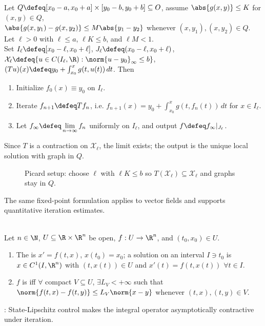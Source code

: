 \begin{method} \label{meth:picard-iteration-local-ode} \\
Let $Q\defeq[x_0-a,x_0+a]\times[y_0-b,y_0+b]\subseteq O$, assume $\abs{g(x,y)}\leq K$ for $(x,y)\in Q$,\\
$\abs{g(x,y_1)-g(x,y_2)}\leq M\abs{y_1-y_2}$ whenever $(x,y_1),(x,y_2)\in Q$. Let $\ell>0$ with $\ell\leq a$, $\ell K\leq b$, and $\ell M<1$.\\
Set $I_\ell\defeq[x_0-\ell,x_0+\ell]$, $J_\ell\defeq(x_0-\ell,x_0+\ell)$, $\mathcal{X}_\ell\defeq\{u\in C(I_\ell,\R):\norm{u-y_0}_\infty\leq b\}$,\\
$(Tu)(x)\defeq y_0+\int_{x_0}^{x}g(t,u(t))\,dt$. Then
\begin{enumerate}[label=(\roman*)]
\setlength{\itemsep}{0pt}
\item Initialize $f_0(x)\equiv y_0$ on $I_\ell$.
\item Iterate $f_{n+1}\defeq Tf_n$, i.e. $f_{n+1}(x)=y_0+\int_{x_0}^{x}g(t,f_n(t))\,dt$ for $x\in I_\ell$.
\item Let $f_\infty\defeq\lim\limits_{n\to\infty}f_n$ uniformly on $I_\ell$, and output $f\defeq f_\infty|_{J_\ell}$.
\end{enumerate}
Since $T$ is a contraction on $\mathcal{X}_\ell$, the limit exists; the output is the unique local solution with graph in $Q$.
\end{method}

\begin{figure}[H]
  \centering
  
  \caption{Picard setup: choose $\ell$ with $\ell K\leq b$ so $T(\mathcal X_\ell)\subseteq\mathcal X_\ell$ and graphs stay in $Q$.}
  \label{fig:picard-rectangle-integral-operator}
\end{figure}

The same fixed-point formulation applies to vector fields and supports quantitative iteration estimates.

\begin{definition} \label{def:vector-ivp-and-local-state-lipschitz} \\
Let $n\in\N$, $U\subseteq\R\times\R^n$ be open, $f:U\to\R^n$, and $(t_0,x_0)\in U$.
\begin{enumerate}[label=(\roman*)]
\setlength{\itemsep}{0pt}
\item The  is $x'=f(t,x)$, $x(t_0)=x_0$; a solution on an interval $I\ni t_0$ is $x\in C^1(I,\R^n)$ with $(t,x(t))\in U$ and $x'(t)=f(t,x(t))$ $\forall t\in I$.
\item $f$ is  iff $\forall$ compact $V\subseteq U$, $\exists L_V<+\infty$ such that $\norm{f(t,x)-f(t,y)}\leq L_V\norm{x-y}$ whenever $(t,x),(t,y)\in V$.
\end{enumerate}
: State-Lipschitz control makes the integral operator asymptotically contractive under iteration.
\end{definition}

